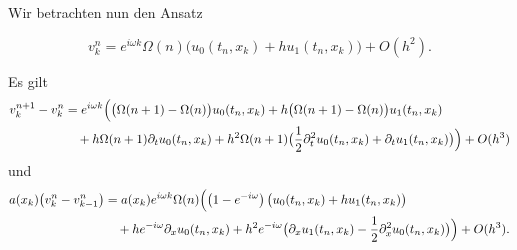 
Wir betrachten nun den Ansatz

\[ v^n_k = e^{i \omega k} \Omega(n) \bigl( u_0(t_n, x_k) + h u_1(t_n, x_k) \bigr) + O(h^2). \]

Es gilt
\begin{align} \label{wkb:zeitdiff}
\begin{split}
v^{n+1}_k - v^n_k
&= e^{i \omega k} \Bigl( \bigl(\Omega(n+1) - \Omega(n) \bigr) u_0(t_n, x_k) + h \bigl(\Omega(n+1) - \Omega(n) \bigr) u_1(t_n, x_k)\\
&\quad + h \Omega(n+1) \partial_t u_0(t_n, x_k) + h^2 \Omega(n+1) \bigl( \frac{1}{2} \partial^2_t u_0(t_n, x_k) + \partial_t u_1(t_n, x_k) \bigr) \Bigr) + O(h^3)
\end{split}
\end{align}
und
\begin{align}
\begin{split}\label{wkb:ortdiff}
a(x_k) \bigl( v^n_k - v^n_{k-1} \bigr)
&= a(x_k) e^{i \omega k} \Omega(n) \Bigl( \left(1-e^{-i \omega}\right) \bigl( u_0(t_n, x_k) + h u_1(t_n, x_k) \bigr)\\
&\quad + h e^{-i \omega} \partial_x u_0(t_n, x_k) + h^2 e^{-i \omega} \bigl( \partial_x u_1(t_n, x_k) - \frac{1}{2} \partial^2_x u_0(t_n, x_k) \bigr) \Bigr) + O(h^3).
\end{split}
\end{align}
